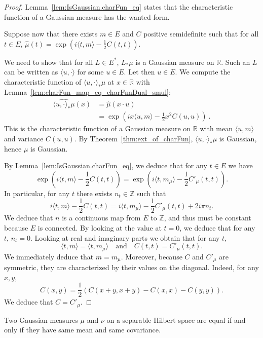 \begin{proof}\leanok
Lemma~\ref{lem:IsGaussian.charFun_eq} states that the characteristic function of a Gaussian measure has the wanted form.

Suppose now that there exists $m \in E$ and $C$ positive semidefinite such that for all $t \in E$, $\hat{\mu}(t) = \exp\left(i \langle t, m \rangle - \frac{1}{2} C(t, t)\right)$.

We need to show that for all $L \in E^*$, $L_*\mu$ is a Gaussian measure on $\mathbb{R}$.
Such an $L$ can be written as $\langle u, \cdot \rangle$ for some $u \in E$.
Let then $u \in E$. We compute the characteristic function of $\langle u, \cdot\rangle_*\mu$ at $x \in \mathbb{R}$ with Lemma~\ref{lem:charFun_map_eq_charFunDual_smul}:
\begin{align*}
  \widehat{\langle u, \cdot\rangle_*\mu}(x)
  &= \hat{\mu}(x \cdot u)
  \\
  &= \exp\left(i x \langle u, m \rangle - \frac{1}{2} x^2 C(u, u)\right)
  \: .
\end{align*}
This is the characteristic function of a Gaussian measure on $\mathbb{R}$ with mean $\langle u, m \rangle$ and variance $C(u, u)$.
By Theorem~\ref{thm:ext_of_charFun}, $\langle u, \cdot\rangle_*\mu$ is Gaussian, hence $\mu$ is Gaussian.

By Lemma~\ref{lem:IsGaussian.charFun_eq}, we deduce that for any $t \in E$ we have
$$\exp\left(i\langle t, m \rangle - \frac{1}{2} C(t, t)\right) = \exp\left(i\langle t, m_\mu \rangle - \frac{1}{2} C'_\mu(t, t)\right).$$
In particular, for any $t$ there exists $n_t \in \mathbb{Z}$ such that
$$i\langle t, m \rangle - \frac{1}{2} C(t, t) = i\langle t, m_\mu \rangle - \frac{1}{2} C'_\mu(t, t) + 2i\pi n_t.$$
We deduce that $n$ is a continuous map from $E$ to $\mathbb{Z}$, and thus must be constant because $E$ is connected. By looking at the value at $t = 0$, we deduce that for any $t$, $n_t = 0$. Looking at real and imaginary parts we obtain that for any $t$,
$$\langle t, m \rangle = \langle t, m_\mu \rangle \quad \text{and} \quad C(t, t) = C'_\mu(t, t).$$
We immediately deduce that $m = m_\mu$. Moreover, because $C$ and $C'_\mu$ are symmetric, they are characterized by their values on the diagonal. Indeed, for any $x, y$,
$$C(x, y) = \frac{1}{2} (C(x + y, x + y) - C(x, x) - C(y, y)).$$
We deduce that $C = C'_\mu$.
\end{proof}

\begin{lemma}\label{lem:IsGaussian.ext_iff}
  \mathlibok
Two Gaussian measures $\mu$ and $\nu$ on a separable Hilbert space are equal if and only if they have same mean and same covariance.
\end{lemma}

